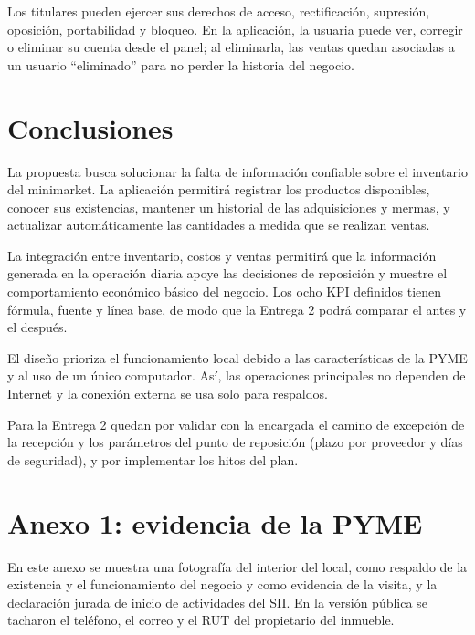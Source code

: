 \documentclass[10pt,a4paper]{article}
\renewcommand{\thesection}{\Alph{section}}
\begin{document}
Los titulares pueden ejercer sus derechos de acceso, rectificación, supresión, oposición, portabilidad y bloqueo. En la aplicación, la usuaria puede ver, corregir o eliminar su cuenta desde el panel; al eliminarla, las ventas quedan asociadas a un usuario ``eliminado'' para no perder la historia del negocio.

\section{Conclusiones}

La propuesta busca solucionar la falta de información confiable sobre el inventario del minimarket. La aplicación permitirá registrar los productos disponibles, conocer sus existencias, mantener un historial de las adquisiciones y mermas, y actualizar automáticamente las cantidades a medida que se realizan ventas.

La integración entre inventario, costos y ventas permitirá que la información generada en la operación diaria apoye las decisiones de reposición y muestre el comportamiento económico básico del negocio. Los ocho KPI definidos tienen fórmula, fuente y línea base, de modo que la Entrega 2 podrá comparar el antes y el después.

El diseño prioriza el funcionamiento local debido a las características de la PYME y al uso de un único computador. Así, las operaciones principales no dependen de Internet y la conexión externa se usa solo para respaldos.

Para la Entrega 2 quedan por validar con la encargada el camino de excepción de la recepción y los parámetros del punto de reposición (plazo por proveedor y días de seguridad), y por implementar los hitos del plan.

\clearpage
\setcounter{section}{0}
\renewcommand{\thesection}{\arabic{section}}

\section*{Anexo 1: evidencia de la PYME}

En este anexo se muestra una fotografía del interior del local, como respaldo de la existencia y el funcionamiento del negocio y como evidencia de la visita, y la declaración jurada de inicio de actividades del SII. En la versión pública se tacharon el teléfono, el correo y el RUT del propietario del inmueble.
\end{document}
